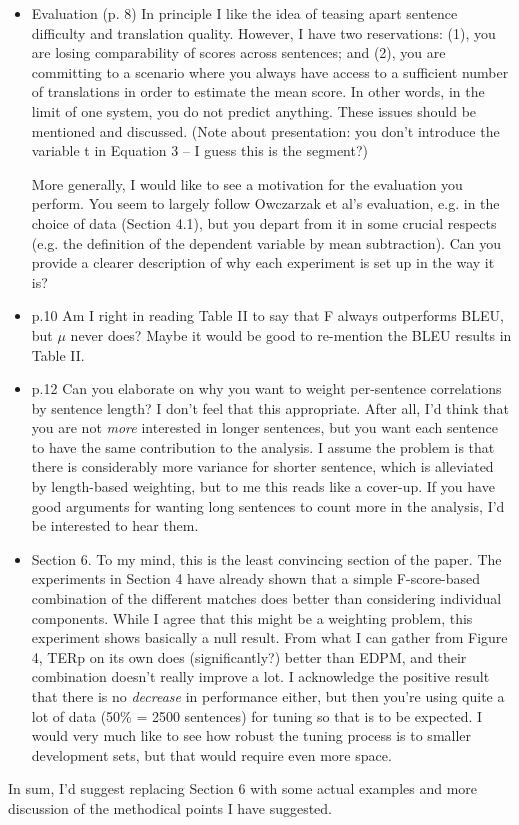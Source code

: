\documentclass[letterpaper,12pt]{article}
\begin{document}
\begin{itemize}
\item  Evaluation (p. 8) In principle I like the idea of teasing apart
  sentence difficulty and translation quality. However, I have two
  reservations: (1), you are losing comparability of scores across
  sentences; and (2), you are committing to a scenario where you
  always have access to a sufficient number of translations in order
  to estimate the mean score. In other words, in the limit of one
  system, you do not predict anything.  These issues should be
  mentioned and discussed.  (Note about presentation: you don't
  introduce the variable t in Equation 3 -- I guess this is the
  segment?)
 
  More generally, I would like to see a motivation for the evaluation
  you perform. You seem to largely follow Owczarzak et al's
  evaluation, e.g. in the choice of data (Section 4.1), but you depart
  from it in some crucial respects (e.g. the definition of the
  dependent variable by mean subtraction). Can you provide a clearer
  description of why each experiment is set up in the way it is?

\item  p.10 Am I right in reading Table II to say that F always
  outperforms BLEU, but $\mu$ never does? Maybe it would be good to
  re-mention the BLEU results in Table II.

\item  p.12 Can you elaborate on why you want to weight per-sentence
  correlations by sentence length? I don't feel that this
  appropriate. After all, I'd think that you are not \emph{more}
  interested in longer sentences, but you want each sentence to have
  the same contribution to the analysis. I assume the problem is that
  there is considerably more variance for shorter sentence, which is
  alleviated by length-based weighting, but to me this reads like a
  cover-up. If you have good arguments for wanting long sentences to
  count more in the analysis, I'd be interested to hear them.

\item  Section 6. To my mind, this is the least convincing section of the
  paper. The experiments in Section 4 have already shown that a simple
  F-score-based combination of the different matches does better than
  considering individual components. While I agree that this might be
  a weighting problem, this experiment shows basically a null result.
  From what I can gather from Figure 4, TERp on its own does
  (significantly?) better than EDPM, and their combination doesn't
  really improve a lot. I acknowledge the positive result that there
  is no \emph{decrease} in performance either, but then you're using
  quite a lot of data (50\% = 2500 sentences) for tuning so that is to
  be expected. I would very much like to see how robust the tuning
  process is to smaller development sets, but that would require even
  more space.
\end{itemize}
 In sum, I'd suggest replacing Section 6 with some actual examples
 and more discussion of the methodical points I have suggested.
\end{document}
